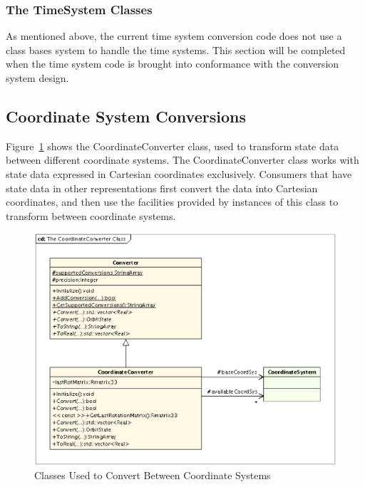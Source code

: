 \subsubsection{The TimeSystem Classes}

As mentioned above, the current time system conversion code does not use a class bases system to
handle the time systems.  This section will be completed when the time system code is brought into
conformance with the conversion system design.

\subsection{Coordinate System Conversions}

Figure~\ref{figure:CoordinateConverterClasses} shows the CoordinateConverter class, used to
transform state data between different coordinate systems.  The CoordinateConverter class works
with state data expressed in Cartesian coordinates exclusively.  Consumers that have state data in
other representations first convert the data into Cartesian coordinates, and then use the
facilities provided by instances of this class to transform between coordinate systems.

\begin{figure}[htb]
\begin{center}
\includegraphics[scale=0.5]{Images/TheCoordinateConverterClass.eps}
\caption{\label{figure:CoordinateConverterClasses}Classes Used to Convert Between Coordinate
Systems}
\end{center}
\end{figure}

